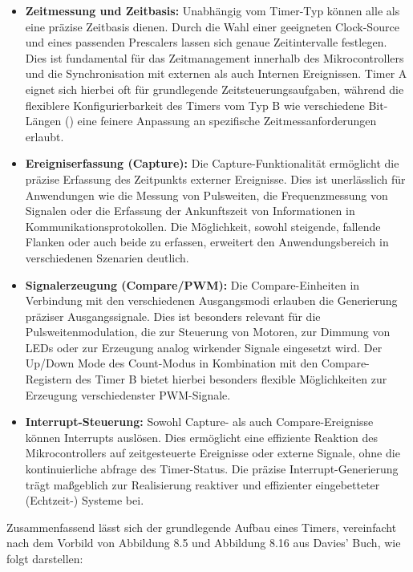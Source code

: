 \begin{itemize}
	\item \textbf{Zeitmessung und Zeitbasis:} Unabh\"angig vom Timer-Typ k\"onnen alle als eine pr\"azise Zeitbasis dienen. Durch die Wahl einer geeigneten Clock-Source und eines passenden Prescalers lassen sich genaue Zeitintervalle festlegen. Dies ist fundamental f\"ur das Zeitmanagement innerhalb des Mikrocontrollers und die Synchronisation mit externen als auch Internen Ereignissen. Timer A eignet sich hierbei oft f\"ur grundlegende Zeitsteuerungsaufgaben, w\"ahrend die flexiblere Konfigurierbarkeit des Timers vom Typ B wie \zB verschiedene Bit-L\"angen () eine feinere Anpassung an spezifische Zeitmessanforderungen erlaubt.

	\item \textbf{Ereigniserfassung (Capture):} Die Capture-Funktionalit\"at erm\"oglicht die pr\"azise Erfassung des Zeitpunkts externer Ereignisse. Dies ist unerl\"asslich f\"ur Anwendungen wie die Messung von Pulsweiten, die Frequenzmessung von Signalen oder die Erfassung der Ankunftszeit von Informationen in Kommunikationsprotokollen. Die M\"oglichkeit, sowohl steigende, fallende Flanken oder auch beide zu erfassen, erweitert den Anwendungsbereich in verschiedenen Szenarien deutlich.

	\item \textbf{Signalerzeugung (Compare/PWM):} Die Compare-Einheiten in Verbindung mit den verschiedenen Ausgangsmodi erlauben die Generierung pr\"aziser Ausgangssignale. Dies ist besonders relevant f\"ur die Pulsweitenmodulation, die zur Steuerung von Motoren, zur Dimmung von LEDs oder zur Erzeugung analog wirkender Signale eingesetzt wird. Der Up/Down Mode des Count-Modus in Kombination mit den Compare-Registern des Timer B bietet hierbei besonders flexible M\"oglichkeiten zur Erzeugung verschiedenster PWM-Signale.

	\item \textbf{Interrupt-Steuerung:} Sowohl Capture- als auch Compare-Ereignisse k\"onnen Interrupts ausl\"osen. Dies erm\"oglicht eine effiziente Reaktion des Mikrocontrollers auf zeitgesteuerte Ereignisse oder externe Signale, ohne die kontinuierliche abfrage des Timer-Status. Die pr\"azise Interrupt-Generierung tr\"agt maßgeblich zur Realisierung reaktiver und effizienter eingebetteter (Echtzeit-) Systeme bei.
\end{itemize}

Zusammenfassend l\"asst sich der grundlegende Aufbau eines Timers, vereinfacht nach dem Vorbild von Abbildung 8.5 und Abbildung 8.16 aus Davies' Buch, wie folgt darstellen:

